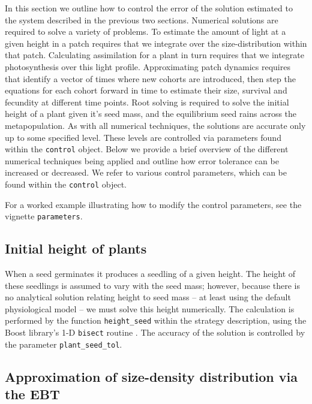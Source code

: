 \documentclass[10pt,twoside]{article}
\begin{document}
In this section we outline how to control the error of the solution
estimated to the system described in the previous two sections.
Numerical solutions are required to solve a variety of problems. To
estimate the amount of light at a given height in a patch requires that
we integrate over the size-distribution within that patch. Calculating
assimilation for a plant in turn requires that we integrate
photosynthesis over this light profile. Approximating patch dynamics
requires that identify a vector of times where new cohorts are
introduced, then step the equations for each cohort forward in time to
estimate their size, survival and fecundity at different time points.
Root solving is required to solve the initial height of a plant given
it's seed mass, and the equilibrium seed rains across the
metapopulation. As with all numerical techniques, the solutions are
accurate only up to some specified level. These levels are controlled
via parameters found within the \texttt{control} object. Below we
provide a brief overview of the different numerical techniques being
applied and outline how error tolerance can be increased or decreased.
We refer to various control parameters, which can be found within the
\texttt{control} object.

For a worked example illustrating how to modify the control parameters,
see the vignette \texttt{parameters}.

\subsection{Initial height of plants}\label{initial-height-of-plants}

When a seed germinates it produces a seedling of a given height. The
height of these seedlings is assumed to vary with the seed mass;
however, because there is no analytical solution relating height to seed
mass -- at least using the default physiological model -- we must solve
this height numerically. The calculation is performed by the function
\texttt{height\_seed} within the strategy description, using the Boost
library's 1-D \texttt{bisect} routine
\citep{Schaling-2014, Eddelbuettel-2015}. The accuracy of the solution
is controlled by the parameter \texttt{plant\_seed\_tol}.

\subsection{Approximation of size-density distribution via the EBT}
\label{approximation-of-size-density-distribution-via-the-ebt}
\end{document}
